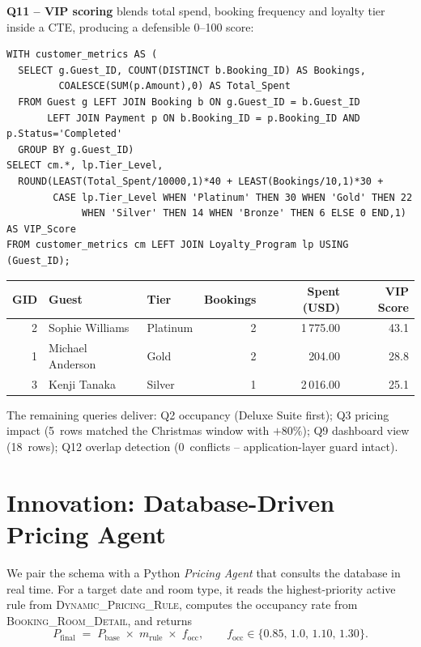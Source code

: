 \documentclass[11pt,a4paper]{article}
\begin{document}
\textbf{Q11 -- VIP scoring} blends total spend, booking frequency and loyalty
tier inside a CTE, producing a defensible 0--100 score:

\begin{lstlisting}[style=sqlstyle,caption={Q11 -- VIP scoring CTE (Guest, Booking, Payment, Loyalty\_Program).}]
WITH customer_metrics AS (
  SELECT g.Guest_ID, COUNT(DISTINCT b.Booking_ID) AS Bookings,
         COALESCE(SUM(p.Amount),0) AS Total_Spent
  FROM Guest g LEFT JOIN Booking b ON g.Guest_ID = b.Guest_ID
       LEFT JOIN Payment p ON b.Booking_ID = p.Booking_ID AND p.Status='Completed'
  GROUP BY g.Guest_ID)
SELECT cm.*, lp.Tier_Level,
  ROUND(LEAST(Total_Spent/10000,1)*40 + LEAST(Bookings/10,1)*30 +
        CASE lp.Tier_Level WHEN 'Platinum' THEN 30 WHEN 'Gold' THEN 22
             WHEN 'Silver' THEN 14 WHEN 'Bronze' THEN 6 ELSE 0 END,1) AS VIP_Score
FROM customer_metrics cm LEFT JOIN Loyalty_Program lp USING (Guest_ID);
\end{lstlisting}

\begin{center}\footnotesize
\begin{tabular}{rllrrr}
\toprule
GID & Guest & Tier & Bookings & Spent (USD) & VIP Score \\
\midrule
2 & Sophie Williams   & Platinum & 2 & 1\,775.00 & 43.1 \\
1 & Michael Anderson  & Gold     & 2 &    204.00 & 28.8 \\
3 & Kenji Tanaka      & Silver   & 1 & 2\,016.00 & 25.1 \\
\bottomrule
\end{tabular}
\end{center}

The remaining queries deliver: Q2 occupancy (Deluxe Suite first); Q3 pricing
impact (5~rows matched the Christmas window with $+80\%$); Q9 dashboard view
(18~rows); Q12 overlap detection (0~conflicts -- application-layer guard
intact).

\section{Innovation: Database-Driven Pricing Agent}

We pair the schema with a Python \emph{Pricing Agent} that consults the
database in real time. For a target date and room type, it reads the
highest-priority active rule from \textsc{Dynamic\_Pricing\_Rule}, computes
the occupancy rate from \textsc{Booking\_Room\_Detail}, and returns
\begin{equation*}
P_\text{final} \;=\; P_\text{base} \;\times\; m_\text{rule} \;\times\; f_\text{occ},
\qquad f_\text{occ} \in \{0.85,\,1.0,\,1.10,\,1.30\}.
\end{equation*}
\end{document}
